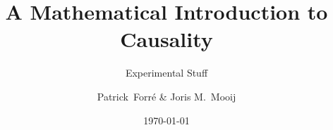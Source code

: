 \documentclass[12pt, a4paper]{scrartcl}
\begin{document}

\begin{titlepage}
\title{A Mathematical Introduction to Causality}
\subtitle{Experimental Stuff}

\author{Patrick~Forr\'e \& Joris M.~Mooij
\date{\small \today}
}

 
\maketitle


\thispagestyle{empty}
\end{titlepage}



  
\clearpage
%

\clearpage
\renewcommand{\contentsname}{Table of Contents}
\tableofcontents
{}

\clearpage

\clearpage

\clearpage

\clearpage

\clearpage

\clearpage


\clearpage

\clearpage

%
\clearpage

\clearpage

\end{document}

